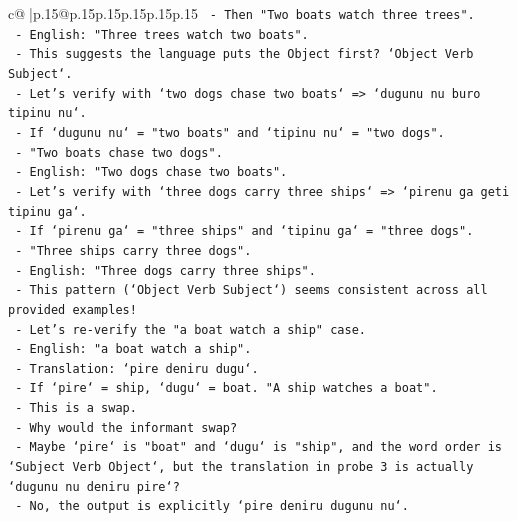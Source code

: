 \documentclass{article}
\begin{document}
{\begin{supertabular}{c@{$\;$}|p{.15\linewidth}@{}p{.15\linewidth}p{.15\linewidth}p{.15\linewidth}p{.15\linewidth}p{.15\linewidth}}
{{{\texttt{                     {-} Then "Two boats watch three trees".} \\
\texttt{                     {-} English: "Three trees watch two boats".} \\
\texttt{                     {-} This suggests the language puts the Object first? `Object Verb Subject`.} \\
\texttt{                     {-} Let's verify with `two dogs chase two boats` => `dugunu nu buro tipinu nu`.} \\
\texttt{                       {-} If `dugunu nu` = "two boats" and `tipinu nu` = "two dogs".} \\
\texttt{                       {-} "Two boats chase two dogs".} \\
\texttt{                       {-} English: "Two dogs chase two boats".} \\
\texttt{                     {-} Let's verify with `three dogs carry three ships` => `pirenu ga geti tipinu ga`.} \\
\texttt{                       {-} If `pirenu ga` = "three ships" and `tipinu ga` = "three dogs".} \\
\texttt{                       {-} "Three ships carry three dogs".} \\
\texttt{                       {-} English: "Three dogs carry three ships".} \\
\texttt{                     {-} This pattern (`Object Verb Subject`) seems consistent across all provided examples!} \\
\texttt{                     {-} Let's re{-}verify the "a boat watch a ship" case.} \\
\texttt{                       {-} English: "a boat watch a ship".} \\
\texttt{                       {-} Translation: `pire deniru dugu`.} \\
\texttt{                       {-} If `pire` = ship, `dugu` = boat. "A ship watches a boat".} \\
\texttt{                       {-} This is a swap.} \\
\texttt{                       {-} Why would the informant swap?} \\
\texttt{                       {-} Maybe `pire` is "boat" and `dugu` is "ship", and the word order is `Subject Verb Object`, but the translation in probe 3 is actually `dugunu nu deniru pire`?} \\
\texttt{                       {-} No, the output is explicitly `pire deniru dugunu nu`.} \\
}}}
\end{supertabular}}
\end{document}
